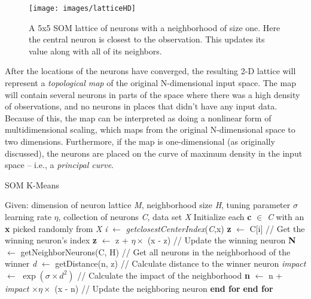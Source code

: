 \documentclass{l4proj}
\begin{document}
\begin{figure}[H]
	\centering
    \label{somLattice}
    \texttt{[image: images/latticeHD]}
    \caption{A 5x5 SOM lattice of neurons with a neighborhood of size one. Here the central neuron is closest to the observation. This updates its value along with all of its neighbors.} 
\end{figure}

After the locations of the neurons have converged, the resulting 2-D lattice will represent a \textit{topological map} of the original N-dimensional input space. The map will contain several neurons in parts of the space where there was a high density of observations, and no neurons in places that didn't have any input data. Because of this, the map can be interpreted as doing a nonlinear form of multidimensional scaling, which maps from the original N-dimensional space to two dimensions\cite{MLIntro}. Furthermore, if the map is one-dimensional (as originally discussed), the neurons are placed on the curve of maximum density in the input space -- i.e., a \textit{principal curve}\cite{SOM}.

\begin{algorithm}[H]
\caption{SOM K-Means}\label{som-alg}
\begin{algorithmic}[1]
\State Given: dimension of neuron lattice \textit{M}, neighborhood size \textit{H}, tuning parameter $\sigma$
\State \hspace{1.1cm} learning rate $\eta$, collection of neurons \textit{C}, data set \textit{X}
\State Initialize each \textbf{c} $\in$ \textit{C} with an \textbf{x} picked randomly from \textit{X}
    \State \textit{i}  $\gets$ \textit{getclosestCenterIndex}(\textit{C},x)
    \State \textbf{z}  $\gets$ C[i] \hspace{3.85cm} // Get the winning neuron's index
    \State \textbf{z} $\gets$ z + $\eta \times$ (x - z) \hspace{2.35cm} // Update the winning neuron
    \State \textbf{N} $\gets$ getNeighborNeurons(C, H) \hspace{0.1cm} // Get all neurons in the neighborhood of the winner
        \State \textit{d} $\gets$ getDistance(n, z) \hspace{1.3cm} // Calculate distance to the winner neuron
        \State \textit{impact} $\gets$ $\exp(\sigma \times d^2)$ \hspace{1.15cm} // Calculate the impact of the neighborhood
        \State \textbf{n} $\gets$ n + \textit{impact} $\times \eta \times$ (x - n) \hspace{0.3cm} // Update the neighboring neuron
    \EndFor
    \State \textbf{end for}
\EndFor
\State \textbf{end for}
\end{algorithmic}
\end{algorithm}
\end{document}
